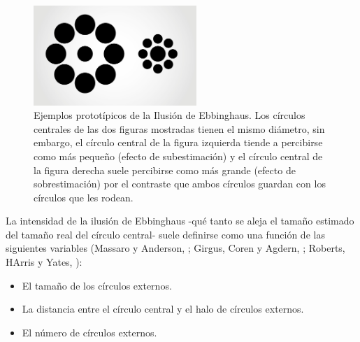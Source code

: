 \begin{figure}[th]
\centering
\includegraphics[width=0.55\textwidth]{Figures/Ebbinghaus} 
\decoRule
\caption[Ilusión de Ebbinghaus: Ejemplos]{Ejemplos prototípicos de la Ilusión de Ebbinghaus. Los círculos centrales de las dos figuras mostradas tienen el mismo diámetro, sin embargo, el círculo central de la figura izquierda tiende a percibirse como más pequeño (efecto de subestimación) y el círculo central de la figura derecha suele percibirse como más grande (efecto de sobrestimación) por el contraste que ambos círculos guardan con los círculos que les rodean.}
\label{fig:Ebbinghaus}
\end{figure}

La intensidad de la ilusión de Ebbinghaus -qué tanto se aleja el tamaño estimado del tamaño real del círculo central- suele definirse como una función de las siguientes variables (Massaro y Anderson, \citeyear{Massaro1971}; Girgus, Coren y Agdern, \citeyear{Girgus1972}; Roberts, HArris y Yates, \citeyear{Roberts2005}): 

\begin{itemize}
\item El tamaño de los círculos externos.
\item La distancia entre el círculo central y el halo de círculos externos.
\item El número de círculos externos.
\end{itemize}

